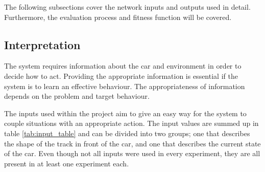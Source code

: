 The following subsections cover the network inputs and outputs used in detail. Furthermore, the evaluation process and fitness function will be covered. 

\subsection{Interpretation}
\label{method:interpretation}

The system requires information about the car and environment in order to decide how to act. Providing the appropriate information is essential if the system is to learn an effective behaviour. The appropriateness of information depends on the problem and target behaviour. 

The inputs used within the project aim to give an easy way for the system to couple situations with an appropriate action. The input values are summed up in table \ref{tab:input_table} and can be divided into two groups; one that describes the shape of the track in front of the car, and one that describes the current state of the car. Even though not all inputs were used in every experiment, they are all present in at least one experiment each.


